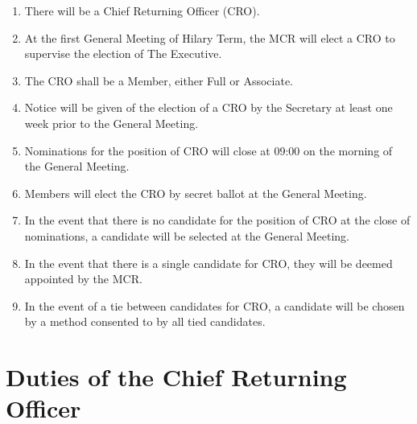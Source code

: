 \documentclass[11pt, a4paper]{article}
\begin{document}
\begin{enumerate}
    \item There will be a Chief Returning Officer (CRO).
    \item At the first General Meeting of Hilary Term, the MCR will elect a CRO to supervise the election of The Executive.
    \item The CRO shall be a Member, either Full or Associate.
    \item Notice will be given of the election of a CRO by the Secretary at least one week prior to the General Meeting.
    \item Nominations for the position of CRO will close at 09:00 on the morning of the General Meeting.
    \item Members will elect the CRO by secret ballot at the General Meeting.
    \item In the event that there is no candidate for the position of CRO at the close of nominations, a candidate will be selected at the General Meeting.
    \item In the event that there is a single candidate for CRO, they will be deemed appointed by the MCR.
    \item In the event of a tie between candidates for CRO, a candidate will be chosen by a method consented to by all tied candidates.
\end{enumerate}





\section{Duties of the Chief Returning Officer}
\label{sec:cro_duties}
\end{document}
